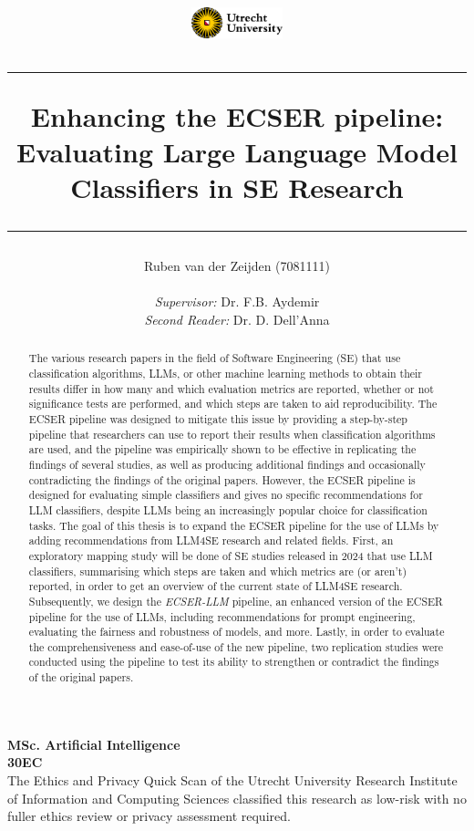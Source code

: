 \documentclass[a4paper]{article}
\title{\includegraphics[width=0.2\textwidth]{figures/UUlogo.png} 
\vspace{0.5cm}
\hrule
\vspace{0.5cm}
\textbf{Enhancing the ECSER pipeline: Evaluating Large Language Model Classifiers in SE Research}\\
\vspace{0.5cm}
\hrule
}
\author{Ruben van der Zeijden (7081111) \\ \\
\textit{Supervisor:} Dr. F.B. Aydemir 
\\ \textit{Second Reader:} Dr. D. Dell'Anna \\
}
\newcommand{\newecser}{\textit{ECSER-LLM} }
\begin{document}
\date{}
\maketitle
\begin{center}
\begin{abstract}
The various research papers in the field of Software Engineering (SE) that use classification algorithms, LLMs, or other machine learning methods to obtain their results differ in how many and which evaluation metrics are reported, whether or not significance tests are performed, and which steps are taken to aid reproducibility. The ECSER pipeline was designed to mitigate this issue by providing a step-by-step pipeline that researchers can use to report their results when classification algorithms are used, and the pipeline was empirically shown to be effective in replicating the findings of several studies, as well as producing additional findings and occasionally contradicting the findings of the original papers. However, the ECSER pipeline is designed for evaluating simple classifiers and gives no specific recommendations for LLM classifiers, despite LLMs being an increasingly popular choice for classification tasks. 
The goal of this thesis is to expand the ECSER pipeline for the use of LLMs by adding recommendations from LLM4SE research and related fields. First, an exploratory mapping study will be done of SE studies released in 2024 that use LLM classifiers, summarising which steps are taken and which metrics are (or aren't) reported, in order to get an overview of the current state of LLM4SE research. Subsequently, we design the \newecser pipeline, an enhanced version of the ECSER pipeline for the use of LLMs, including recommendations for prompt engineering, evaluating the fairness and robustness of models, and more. Lastly, in order to evaluate the comprehensiveness and ease-of-use of the new pipeline, two replication studies were conducted using the pipeline to test its ability to strengthen or contradict the findings of the original papers.
\end{abstract}
\vfill 
\textbf{MSc. Artificial Intelligence}\\
\textbf{30EC} \\ 
\footnotesize{The Ethics and Privacy Quick Scan of the Utrecht University Research Institute of Information and Computing Sciences classified this research as low-risk with no fuller ethics review or privacy assessment required.}
\vspace{0.5cm}
\end{center}
\end{document}
